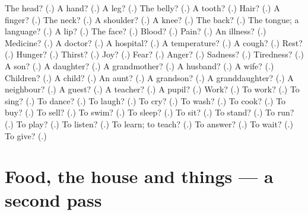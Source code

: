 \begin{tcolorbox}[breakable,colback=teal!4,colframe=teal!35!black,title={Before you move on}]
The head? (\textbf{}.) A hand? (\textbf{}.) A leg? (\textbf{}.) The belly? (\textbf{}.) A tooth? (\textbf{}.) Hair? (\textbf{}.) A finger? (\textbf{}.) The neck? (\textbf{}.) A shoulder? (\textbf{}.) A knee? (\textbf{}.) The back? (\textbf{}.) The tongue; a language? (\textbf{}.) A lip? (\textbf{}.) The face? (\textbf{}.) Blood? (\textbf{}.) Pain? (\textbf{}.) An illness? (\textbf{}.) Medicine? (\textbf{}.) A doctor? (\textbf{}.) A hospital? (\textbf{}.) A temperature? (\textbf{}.) A cough? (\textbf{}.) Rest? (\textbf{}.) Hunger? (\textbf{}.) Thirst? (\textbf{}.) Joy? (\textbf{}.) Fear? (\textbf{}.) Anger? (\textbf{}.) Sadness? (\textbf{}.) Tiredness? (\textbf{}.) A son? (\textbf{}.) A daughter? (\textbf{}.) A grandmother? (\textbf{}.) A husband? (\textbf{}.) A wife? (\textbf{}.) Children? (\textbf{}.) A child? (\textbf{}.) An aunt? (\textbf{}.) A grandson? (\textbf{}.) A granddaughter? (\textbf{}.) A neighbour? (\textbf{}.) A guest? (\textbf{}.) A teacher? (\textbf{}.) A pupil? (\textbf{}.) Work? (\textbf{}.) To work? (\textbf{}.) To sing? (\textbf{}.) To dance? (\textbf{}.) To laugh? (\textbf{}.) To cry? (\textbf{}.) To wash? (\textbf{}.) To cook? (\textbf{}.) To buy? (\textbf{}.) To sell? (\textbf{}.) To swim? (\textbf{}.) To sleep? (\textbf{}.) To sit? (\textbf{}.) To stand? (\textbf{}.) To run? (\textbf{}.) To play? (\textbf{}.) To listen? (\textbf{}.) To learn; to teach? (\textbf{}.) To answer? (\textbf{}.) To wait? (\textbf{}.) To give? (\textbf{}.)
\end{tcolorbox}
\section[(dialogue)]{Food, the house and things — a second pass}

